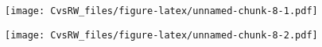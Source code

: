 \documentclass[
]{article}
\newenvironment{Shaded}{\begin{snugshade}}{\end{snugshade}}
\newcommand{\DataTypeTok}[1]{\textcolor[rgb]{0.13,0.29,0.53}{#1}}
\newcommand{\FloatTok}[1]{\textcolor[rgb]{0.00,0.00,0.81}{#1}}
\newcommand{\KeywordTok}[1]{\textcolor[rgb]{0.13,0.29,0.53}{\textbf{#1}}}
\newcommand{\NormalTok}[1]{#1}
\newcommand{\OperatorTok}[1]{\textcolor[rgb]{0.81,0.36,0.00}{\textbf{#1}}}
\newcommand{\StringTok}[1]{\textcolor[rgb]{0.31,0.60,0.02}{#1}}
\begin{document}
\texttt{[image: CvsRW\_files/figure-latex/unnamed-chunk-8-1.pdf]}

\begin{Shaded}
\end{Shaded}

\texttt{[image: CvsRW\_files/figure-latex/unnamed-chunk-8-2.pdf]}

\begin{Shaded}
\end{Shaded}
\end{document}
